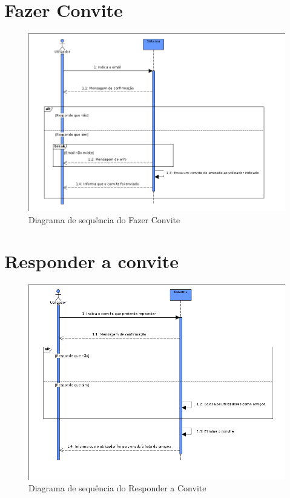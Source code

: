 \documentclass[a4paper]{report}
\begin{document}
\section{Fazer Convite}

\begin{figure}[H]
	\centering 
    \includegraphics[width=\textwidth]{images/fazerconviteSeq.png}  
    \caption{Diagrama de sequência do Fazer Convite}
\end{figure}

\section{Responder a convite}

\begin{figure}[H]
	\centering 
    \includegraphics[width=\textwidth]{images/respconviteSeq.png}  
    \caption{Diagrama de sequência do Responder a Convite}
\end{figure}
\end{document}
